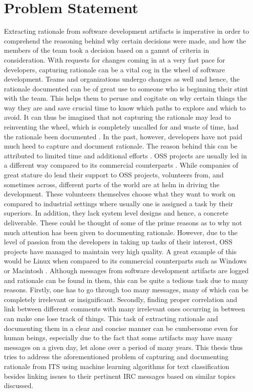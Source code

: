 \documentclass[a4paper,12pt,twoside]{report}
\begin{document}
\section{Problem Statement}
Extracting rationale from software development artifacts is imperative in order to comprehend the reasoning behind why certain decisions were made, and how the members of the team took a decision based on a gamut of criteria in consideration. With requests for changes coming in at a very fast pace for developers, capturing rationale can be a vital cog in the wheel of software development. Teams and organizations undergo changes as well and hence, the rationale documented can be of great use to someone who is beginning their stint with the team. This helps them to peruse and cogitate on why certain things the way they are and save crucial time to know which paths to explore and which to avoid. It can thus be imagined that not capturing the rationale may lead to reinventing the wheel, which is completely uncalled for and waste of time, had the rationale been documented \cite{Bruegge2009}. In the past, however, developers have not paid much heed to capture and document rationale. The reason behind this can be attributed to limited time and additional efforts \cite{Dutoit2006}. 
\newline \newline
OSS projects are usually led in a different way compared to its commercial counterparts \cite{mockus2002two}. While companies of great stature do lend their support to OSS projects, volunteers from, and sometimes across, different parts of the world are at helm in driving the development. These volunteers themselves choose what they want to work on compared to industrial settings where usually one is assigned a task by their superiors. In addition, they lack system level designs and hence, a concrete deliverable. These could be thought of some of the prime reasons as to why not much attention has been given to documenting rationale. However, due to the level of passion from the developers in taking up tasks of their interest, OSS projects have managed to maintain very high quality. A great example of this would be Linux when compared to its commercial counterparts such as Windows or Macintosh \cite{mockus2002two}. 
\newline \newline
Although messages from software development artifacts are logged and rationale can be found in them, this can be quite a tedious task due to many reasons. Firstly, one has to go through too many messages, many of which can be completely irrelevant or insignificant. Secondly, finding proper correlation and link between different comments with many irrelevant ones occurring in between can make one lose track of things. This task of extracting rationale and documenting them in a clear and concise manner can be cumbersome even for human beings, especially due to the fact that some artifacts may have many messages on a given day, let alone over a period of many years. This thesis thus tries to address the aforementioned problem of capturing and documenting rationale from ITS using machine learning algorithms for text classification besides linking issues to their pertinent IRC messages based on similar topics discussed.
\end{document}
